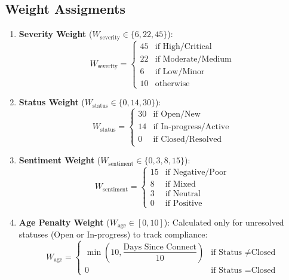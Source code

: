 \documentclass[11pt,a4paper]{article}
\begin{document}
\subsection{Weight Assigments}
\begin{enumerate}
    \item \textbf{Severity Weight} ($W_{\text{severity}} \in \{6, 22, 45\}$):
        \begin{equation}
            W_{\text{severity}} = 
            \begin{cases} 
                45 & \text{if High/Critical} \\
                22 & \text{if Moderate/Medium} \\
                6  & \text{if Low/Minor} \\
                10 & \text{otherwise}
            \end{cases}
        \end{equation}
    \item \textbf{Status Weight} ($W_{\text{status}} \in \{0, 14, 30\}$):
        \begin{equation}
            W_{\text{status}} = 
            \begin{cases} 
                30 & \text{if Open/New} \\
                14 & \text{if In-progress/Active} \\
                0  & \text{if Closed/Resolved}
            \end{cases}
        \end{equation}
    \item \textbf{Sentiment Weight} ($W_{\text{sentiment}} \in \{0, 3, 8, 15\}$):
        \begin{equation}
            W_{\text{sentiment}} = 
            \begin{cases} 
                15 & \text{if Negative/Poor} \\
                8  & \text{if Mixed} \\
                3  & \text{if Neutral} \\
                0  & \text{if Positive}
            \end{cases}
        \end{equation}
    \item \textbf{Age Penalty Weight} ($W_{\text{age}} \in [0, 10]$):
        Calculated only for unresolved statuses (Open or In-progress) to track compliance:
        \begin{equation}
            W_{\text{age}} = 
            \begin{cases}
                \min\left(10, \dfrac{\text{Days Since Connect}}{10}\right) & \text{if Status } \neq \text{Closed} \\
                0 & \text{if Status } = \text{Closed}
            \end{cases}
        \end{equation}
\end{enumerate}
\end{document}
